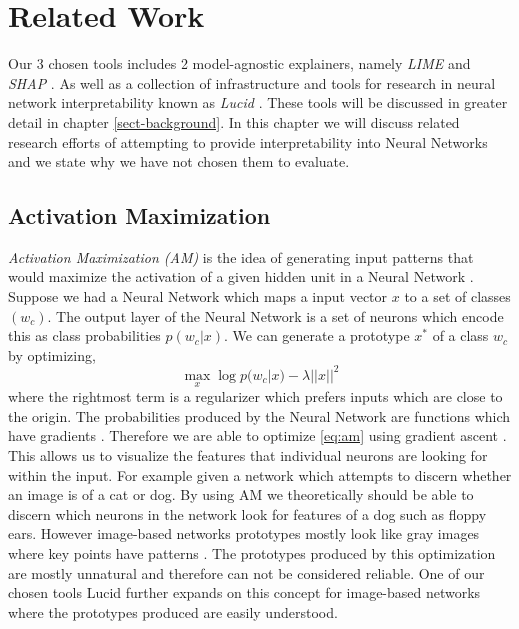 \chapter{Related Work} \label{sect-related}
Our 3 chosen tools includes 2 model-agnostic explainers, namely \emph{LIME} \cite{lime} and \emph{SHAP} \cite{NIPS2017_7062}. As well as a collection of infrastructure and tools for research in neural network interpretability known as \emph{Lucid} \cite{Https://github.com/tensorflow/lucid}. These tools will be discussed in greater detail in chapter \ref{sect-background}. In this chapter we will discuss related research efforts of attempting to provide interpretability into Neural Networks and we state why we have not chosen them to evaluate.

\section{Activation Maximization}
\emph{Activation Maximization (AM)} is the idea of generating input patterns that would maximize the activation of a given hidden unit in a Neural Network \cite{simonyan2014deep}\cite{10.1162/neco.2006.18.8.1868}\cite{articlec}. Suppose we had a Neural Network which maps a input vector $x$ to a set of classes $(w_{c})$. The output layer of the Neural Network is a set of neurons which encode this as class probabilities $p(w_{c}|x)$. We can generate a prototype $x^{*}$ of a class $w_{c}$ by optimizing,
\begin{equation}
    \max_{x} \log p(w_{c}|x) - \lambda||x||^{2}
    \label{eq:am}
\end{equation}
where the rightmost term is a regularizer which prefers inputs which are close to the origin. The probabilities produced by the Neural Network are functions which have gradients \cite{10.5555/525960}. Therefore we are able to optimize \ref{eq:am} using gradient ascent \cite{DBLP:journals/corr/Ruder16}. This allows us to visualize the features that individual neurons are looking for within the input. For example given a network which attempts to discern whether an image is of a cat or dog. By using AM we theoretically should be able to discern which neurons in the network look for features of a dog such as floppy ears. However image-based networks prototypes mostly look like gray images where key points have patterns \cite{simonyan2014deep}. The prototypes produced by this optimization are mostly unnatural and therefore can not be considered reliable. One of our chosen tools Lucid further expands on this concept for image-based networks where the prototypes produced are easily understood. 

